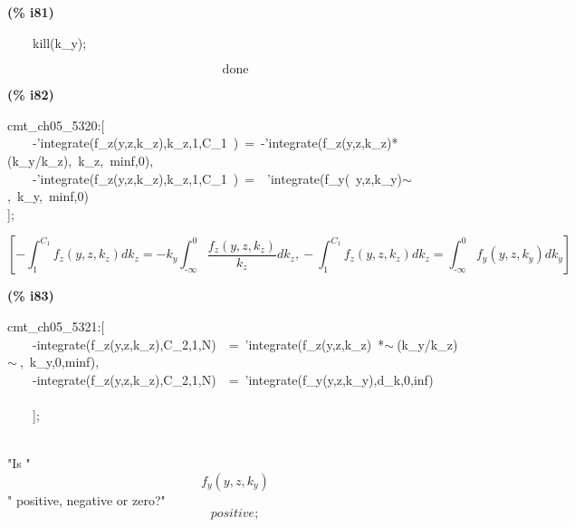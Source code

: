 \documentclass[fleqn]{article}
\begin{document}
\noindent
\begin{minipage}[t]{4.000000em}\color{red}\bfseries
(\% i81)	
\end{minipage}
\begin{minipage}[t]{\textwidth}\color{blue}
\ \ \ \ kill(k\_y);
\end{minipage}
\[\displaystyle \tag{\% o81} 
\ensuremath{\mathrm{done}}\mbox{}
\]


\noindent
\begin{minipage}[t]{4.000000em}\color{red}\bfseries
(\% i82)	
\end{minipage}
\begin{minipage}[t]{\textwidth}\color{blue}
cmt\_ch05\_5320:[\\
\ \ \ \ -'integrate(f\_z(y,z,k\_z),k\_z,1,C\_1\ )\ =\ -'integrate(f\_z(y,z,k\_z)*(k\_y/k\_z),\ k\_z,\ minf,0),\\
\ \ \ \ -'integrate(f\_z(y,z,k\_z),k\_z,1,C\_1\ )\ =\ \ 'integrate(f\_y(\ y,z,k\_y)\ensuremath{\sim\ },\ k\_y,\ minf,0)\\
];
\end{minipage}
\[\displaystyle \tag{\% o82} 
\left[ -\int_{1}^{{C_1}}{\left. {f_z}\left( y\operatorname{,}z\operatorname{,}{k_z}\right) d{k_z}\right.}=-{k_y} \int_{\operatorname{-}\infty }^{0}{\left. \frac{{f_z}\left( y\operatorname{,}z\operatorname{,}{k_z}\right) }{{k_z}}d{k_z}\right.}\operatorname{,}-\int_{1}^{{C_1}}{\left. {f_z}\left( y\operatorname{,}z\operatorname{,}{k_z}\right) d{k_z}\right.}=\int_{\operatorname{-}\infty }^{0}{\left. {f_y}\left( y\operatorname{,}z\operatorname{,}{k_y}\right) d{k_y}\right.}\right] \mbox{}
\]


\noindent
\begin{minipage}[t]{4.000000em}\color{red}\bfseries
(\% i83)	
\end{minipage}
\begin{minipage}[t]{\textwidth}\color{blue}
cmt\_ch05\_5321:[\\
\ \ \ \ -integrate(f\_z(y,z,k\_z),C\_2,1,N)\ \ =\ 'integrate(f\_z(y,z,k\_z)\ *\ensuremath{\sim\ }(k\_y/k\_z)\ensuremath{\sim\ },\ k\_y,0,minf),\\
\ \ \ \ -integrate(f\_z(y,z,k\_z),C\_2,1,N)\ \ =\ 'integrate(f\_y(y,z,k\_y),d\_k,0,inf)\\
\ \ \ \ \\
\ \ \ \ ];
\end{minipage}
\mbox{}\\"Is "
\[\displaystyle {f_y}\left( y\operatorname{,}z\operatorname{,}{k_y}\right) \mbox{}
\]" positive, negative or zero?"
\[\displaystyle positive;\mbox{}\]
\end{document}
